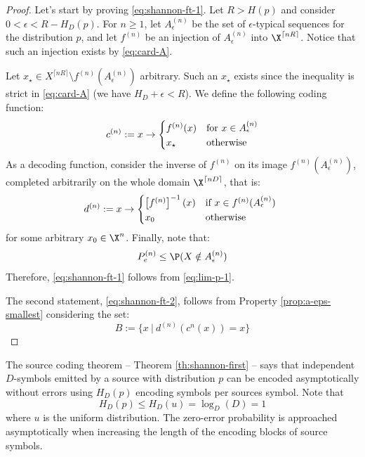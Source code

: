 \documentclass[toc, titlepaged]{../cs-classes/cs-classes}
\begin{document}
\begin{proof}
    Let's start by proving \eqref{eq:shannon-ft-1}. Let $R>H(p)$ and consider $0<\epsilon<R-H_D(p)$. For $n\geq1$, let $A_\epsilon^{(n)}$ be the set of $\epsilon$-typical sequences for the distribution $p$, and let $f^{(n)}$ be an injection of $A_\epsilon^{(n)}$ into $\X^{\lceil nR\rceil}$. Notice that such an injection exists by \eqref{eq:card-A}.

    Let $x_\star\in X^{\lceil nR\rceil}\setminus f^{(n)}(A_\epsilon^{(n)})$ arbitrary. Such an $x_\star$ exists since the inequality is strict in \eqref{eq:card-A} (we have $H_D+\epsilon<R$). We define the following coding function:
    \begin{equation*}
        c^{(n)}:=x\to \begin{cases*}
            f^{(n)}(x) & for $x\in A_\epsilon^{(n)}$\\
            x_\star & otherwise
        \end{cases*}
    \end{equation*}
    As a decoding function, consider the inverse of $f^{(n)}$ on its image $f^{(n)}(A_\epsilon^{(n)})$, completed arbitrarily on the whole domain $\X^{\lceil nD\rceil}$, that is:
    \begin{equation*}
        d^{(n)}:=x\to\begin{cases*}
            \left[f^{(n)}\right]^{-1}(x) & if $x\in f^{(n)}(A_\epsilon^{(n)})$ \\
            x_0 & otherwise
        \end{cases*}
    \end{equation*}
    for some arbitrary $x_0\in \X^n$. Finally, note that:
    \begin{equation*}
        P_e^{(n)}\leq \P(X\notin A_\epsilon^{(n)})
    \end{equation*}
    Therefore, \eqref{eq:shannon-ft-1} follows from \eqref{eq:lim-p-1}.

    The second statement, \eqref{eq:shannon-ft-2}, follows from Property \ref{prop:a-eps-smallest} considering the set:
    \begin{equation*}
        B:=\{x \:|\: d^{(n)}\left(c^{n}(x)\right) = x\}
    \end{equation*}
\end{proof}

\begin{remark}
    The source coding theorem -- Theorem \ref{th:shannon-first} -- says that independent $D$-symbols emitted by a source with distribution $p$ can be encoded asymptotically without errors using $H_D(p)$ encoding symbols per sources symbol. Note that
    \begin{equation*}
        H_D(p)\leq H_D(u)=\log_D(D)=1
    \end{equation*}
    where $u$ is the uniform distribution. The zero-error probability is approached asymptotically when increasing the length of the encoding blocks of source symbols.
\end{remark}
\end{document}
